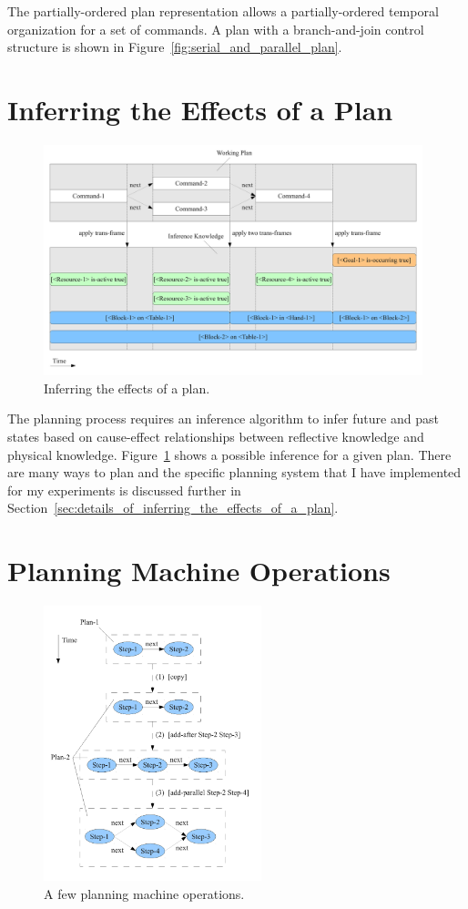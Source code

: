The partially-ordered plan representation allows a partially-ordered
temporal organization for a set of commands.  A plan with a
branch-and-join control structure is shown in
Figure~\ref{fig:serial_and_parallel_plan}.


\section{Inferring the Effects of a Plan}
\label{sec:inferring_the_effects_of_a_plan}

\begin{figure}[bth]
  \center
  \includegraphics[width=11cm]{gfx/infer_plan_effects}
  \caption[Inferring the effects of a plan]{Inferring the effects of
    a plan.}
  \label{fig:infer_plan_effects}
\end{figure}

The planning process requires an inference algorithm to infer future
and past states based on cause-effect relationships between reflective
knowledge and physical knowledge.  Figure~\ref{fig:infer_plan_effects}
shows a possible inference for a given plan.  There are many ways to
plan and the specific planning system that I have implemented for my
experiments is discussed further in
Section~\ref{sec:details_of_inferring_the_effects_of_a_plan}.


\section{Planning Machine Operations}

\begin{figure}[bth]
  \center
  \includegraphics[height=8cm]{gfx/planning_machine_operations}
  \caption[A few planning machine operations]{A few planning machine operations.}
  \label{fig:planning_machine_operations}
\end{figure}

